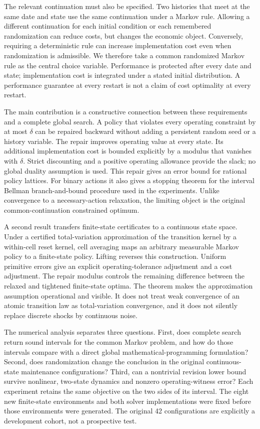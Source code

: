 The relevant continuation must also be specified. Two histories that meet at the same date and state use the same continuation under a Markov rule. Allowing a different continuation for each initial condition or each remembered randomization can reduce costs, but changes the economic object. Conversely, requiring a deterministic rule can increase implementation cost even when randomization is admissible. We therefore take a common randomized Markov rule as the central choice variable. Performance is protected after every date and state; implementation cost is integrated under a stated initial distribution. A performance guarantee at every restart is not a claim of cost optimality at every restart.

The main contribution is a constructive connection between these requirements and a complete global search. A policy that violates every operating constraint by at most $\delta$ can be repaired backward without adding a persistent random seed or a history variable. The repair improves operating value at every state. Its additional implementation cost is bounded explicitly by a modulus that vanishes with $\delta$. Strict discounting and a positive operating allowance provide the slack; no global duality assumption is used. This repair gives an error bound for rational policy lattices. For binary actions it also gives a stopping theorem for the interval Bellman branch-and-bound procedure used in the experiments. Unlike convergence to a necessary-action relaxation, the limiting object is the original common-continuation constrained optimum.

A second result transfers finite-state certificates to a continuous state space. Under a certified total-variation approximation of the transition kernel by a within-cell reset kernel, cell averaging maps an arbitrary measurable Markov policy to a finite-state policy. Lifting reverses this construction. Uniform primitive errors give an explicit operating-tolerance adjustment and a cost adjustment. The repair modulus controls the remaining difference between the relaxed and tightened finite-state optima. The theorem makes the approximation assumption operational and visible. It does not treat weak convergence of an atomic transition law as total-variation convergence, and it does not silently replace discrete shocks by continuous noise.

The numerical analysis separates three questions. First, does complete search return sound intervals for the common Markov problem, and how do those intervals compare with a direct global mathematical-programming formulation? Second, does randomization change the conclusion in the original continuous-state maintenance configurations? Third, can a nontrivial revision lower bound survive nonlinear, two-state dynamics and nonzero operating-witness error? Each experiment retains the same objective on the two sides of its interval. The eight new finite-state environments and both solver implementations were fixed before those environments were generated. The original 42 configurations are explicitly a development cohort, not a prospective test.

